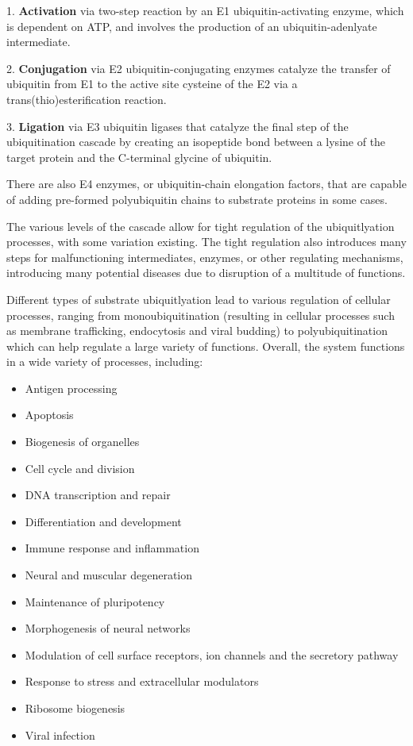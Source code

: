 \documentclass[plain,basic]{inVerba-notes}
\begin{document}
{\begin{enumerate}
{      1. \textbf{Activation} via two-step reaction by an E1 ubiquitin-activating enzyme, which is dependent on ATP, and involves the production of an ubiquitin-adenlyate intermediate. 

      2. \textbf{Conjugation} via E2 ubiquitin-conjugating enzymes catalyze the transfer of ubiquitin from E1 to the active site cysteine of the E2 via a trans(thio)esterification reaction. 

      3. \textbf{Ligation} via E3 ubiquitin ligases that catalyze the final step of the ubiquitination cascade by creating an isopeptide bond between a lysine of the target protein and the C-terminal glycine of ubiquitin. 
      
      There are also E4 enzymes, or ubiquitin-chain elongation factors, that are capable of adding pre-formed polyubiquitin chains to substrate proteins in some cases.

      The various levels of the cascade allow for tight regulation of the ubiquitlyation processes, with some variation existing. The tight regulation also introduces many steps for malfunctioning intermediates, enzymes, or other regulating mechanisms, introducing many potential diseases due to disruption of a multitude of functions.

      Different types of substrate ubiquitlyation lead to various regulation of cellular processes, ranging from monoubiquitination (resulting in cellular processes such as membrane trafficking, endocytosis and viral budding) to polyubiquitination which can help regulate a large variety of functions. Overall, the system functions in a wide variety of processes, including: 
      
      \begin{multicols}{2}
      \begin{itemize}
        \item Antigen processing
        \item Apoptosis
        \item Biogenesis of organelles
        \item Cell cycle and division
        \item DNA transcription and repair
        \item Differentiation and development
        \item Immune response and inflammation
        \item Neural and muscular degeneration
        \item Maintenance of pluripotency
        \item Morphogenesis of neural networks
        \item Modulation of cell surface receptors, ion channels and the secretory pathway
        \item Response to stress and extracellular modulators
        \item Ribosome biogenesis
        \item Viral infection
      \end{itemize}
    \end{multicols}
    }


\end{enumerate}}
\end{document}
